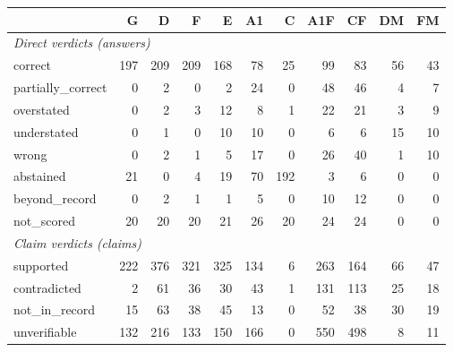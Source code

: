 \begin{tabular}{lrrrrrrrrrr}
\toprule
 & G & D & F & E & A1 & C & A1F & CF & DM & FM \\
\midrule
\multicolumn{11}{l}{\emph{Direct verdicts (answers)}} \\
correct & 197 & 209 & 209 & 168 & 78 & 25 & 99 & 83 & 56 & 43 \\
partially\_correct & 0 & 2 & 0 & 2 & 24 & 0 & 48 & 46 & 4 & 7 \\
overstated & 0 & 2 & 3 & 12 & 8 & 1 & 22 & 21 & 3 & 9 \\
understated & 0 & 1 & 0 & 10 & 10 & 0 & 6 & 6 & 15 & 10 \\
wrong & 0 & 2 & 1 & 5 & 17 & 0 & 26 & 40 & 1 & 10 \\
abstained & 21 & 0 & 4 & 19 & 70 & 192 & 3 & 6 & 0 & 0 \\
beyond\_record & 0 & 2 & 1 & 1 & 5 & 0 & 10 & 12 & 0 & 0 \\
not\_scored & 20 & 20 & 20 & 21 & 26 & 20 & 24 & 24 & 0 & 0 \\
\midrule
\multicolumn{11}{l}{\emph{Claim verdicts (claims)}} \\
supported & 222 & 376 & 321 & 325 & 134 & 6 & 263 & 164 & 66 & 47 \\
contradicted & 2 & 61 & 36 & 30 & 43 & 1 & 131 & 113 & 25 & 18 \\
not\_in\_record & 15 & 63 & 38 & 45 & 13 & 0 & 52 & 38 & 30 & 19 \\
unverifiable & 132 & 216 & 133 & 150 & 166 & 0 & 550 & 498 & 8 & 11 \\
\bottomrule
\end{tabular}
